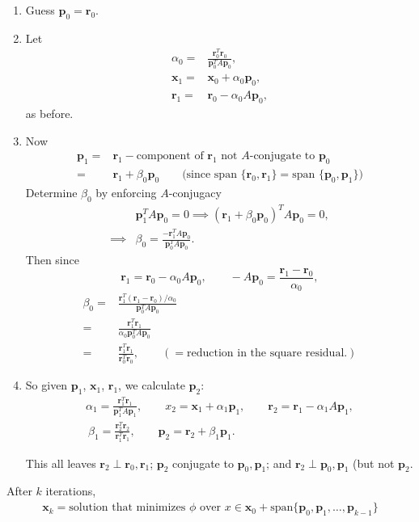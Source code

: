 \documentclass[12pt, a4paper]{article}
\renewcommand{\vec}[1]{\mathbf{#1}}
\theoremstyle{definition}
\theoremstyle{remark}
\numberwithin{equation}{section}
\begin{document}
\begin{enumerate}
\item Guess $\vec{p}_0=\vec{r}_0$.
\item Let \begin{align*}
\alpha_0 = & \frac{\vec{r}_0^T\vec{r}_0}{\vec{p}_0^TA\vec{p}_0},\\
\vec{x}_1 = & \vec{x}_0+\alpha_0\vec{p}_0,\\
\vec{r}_1 = & \vec{r}_0-\alpha_0A\vec{p}_0,
\end{align*}
as before. 
\item Now 
\begin{align*}
\vec{p}_1 = & \vec{r}_1 - \mbox{component of $\vec{r}_1$ not $A$-conjugate to $\vec{p}_0$}\\
= & \vec{r}_1 + \beta_0 \vec{p}_0 \qquad \mbox{(since span $\{\vec{r}_0,\vec{r}_1\}=$span $\{\vec{p}_0,\vec{p}_1\}$)}
\end{align*}
Determine $\beta_0$ by enforcing $A$-conjugacy
\begin{align*}
&\vec{p}_1^T A \vec{p}_0 = 0 \implies (\vec{r}_1 + \beta_0\vec{p}_0)^T A \vec{p}_0=0,\\
\implies& \beta_0=\frac{-\vec{r}_1^TA\vec{p}_0}{\vec{p}_0^TA\vec{p}_0}.
\end{align*}
Then since
\begin{equation*}
\vec{r}_1=\vec{r}_0-\alpha_0 A \vec{p}_0, \qquad -A\vec{p}_0=\frac{\vec{r}_1-\vec{r}_0}{\alpha_0},
\end{equation*}
\begin{align*}
\beta_0=&\frac{\vec{r}_1^T (\vec{r}_1-\vec{r}_0)/\alpha_0}{\vec{p}_0^T A\vec{p}_0}\\
=& \frac{\vec{r}_1^T \vec{r}_1}{\alpha_0 \vec{p}_0^T A \vec{p}_0}\\
=&\frac{\vec{r}_1^T \vec{r}_1}{\vec{r}_0^T \vec{r}_0}, \qquad(=\mbox{reduction in the square residual.})
\end{align*}

\item So given $\vec{p}_1$, $\vec{x}_1$, $\vec{r}_1$, we calculate $\vec{p}_2$:
\begin{align*}
\alpha_1 = \frac{\vec{r}_1^T\vec{r}_1}{\vec{p}_1^T A \vec{p}_1}, \qquad x_2=\vec{x}_1+\alpha_1 \vec{p}_1, \qquad \vec{r}_2= \vec{r}_1-\alpha_1 A \vec{p}_1,\\\
\beta_1=\frac{\vec{r}_2^T\vec{r}_2}{\vec{r}_1^T\vec{r}_1}, \qquad \vec{p}_2=\vec{r}_2+\beta_1 \vec{p}_1.
\end{align*}

This all leaves $\vec{r}_2 \perp \vec{r}_0, \vec{r}_1$; $\vec{p}_2$  conjugate to $\vec{p}_0, \vec{p}_1$; and  $\vec{r}_2 \perp \vec{p}_0, \vec{p}_1$ (but not $\vec{p}_2$.

\end{enumerate}
After $k$ iterations, 
\begin{align*}
\vec{x}_k= \mbox{solution that minimizes $\phi$ over $x \in \vec{x}_0+\mbox{span}\{\vec{p}_0,\vec{p}_1,\ldots,\vec{p}_{k-1}\}$}
\end{align*}
\end{document}

